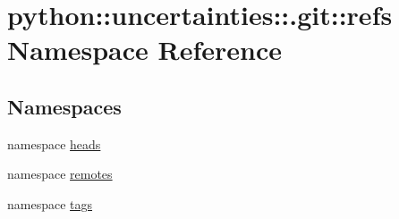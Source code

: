 \hypertarget{namespacepython_1_1uncertainties_1_1_8git_1_1refs}{
\section{python::uncertainties::.git::refs Namespace Reference}
\label{namespacepython_1_1uncertainties_1_1_8git_1_1refs}
}
\subsection*{Namespaces}
\begin{DoxyCompactItemize}
\item 
namespace \hyperlink{namespacepython_1_1uncertainties_1_1_8git_1_1refs_1_1heads}{heads}
\item 
namespace \hyperlink{namespacepython_1_1uncertainties_1_1_8git_1_1refs_1_1remotes}{remotes}
\item 
namespace \hyperlink{namespacepython_1_1uncertainties_1_1_8git_1_1refs_1_1tags}{tags}
\end{DoxyCompactItemize}
